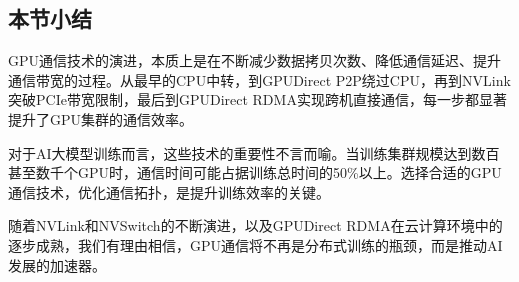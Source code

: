 \subsection{本节小结}

GPU通信技术的演进，本质上是在不断减少数据拷贝次数、降低通信延迟、提升通信带宽的过程。从最早的CPU中转，到GPUDirect P2P绕过CPU，再到NVLink突破PCIe带宽限制，最后到GPUDirect RDMA实现跨机直接通信，每一步都显著提升了GPU集群的通信效率。

对于AI大模型训练而言，这些技术的重要性不言而喻。当训练集群规模达到数百甚至数千个GPU时，通信时间可能占据训练总时间的50\%以上。选择合适的GPU通信技术，优化通信拓扑，是提升训练效率的关键。

随着NVLink和NVSwitch的不断演进，以及GPUDirect RDMA在云计算环境中的逐步成熟，我们有理由相信，GPU通信将不再是分布式训练的瓶颈，而是推动AI发展的加速器。
